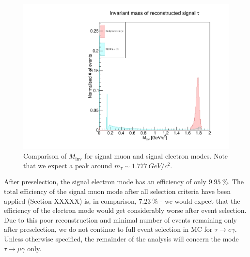 \documentclass[12pt]{thesis}  %
\begin{document}
\begin{figure}
\centering
\includegraphics[width=0.6\linewidth]{images/tauMG-tauEG-tauinvmass.pdf}
\caption[]%
{{\small Comparison of $M_{\text{inv}}$ for signal muon and signal electron modes. Note that we expect a peak around $m_{\tau}\sim \SI{1.777}{GeV/c^2}$.}}
\label{fig:tauMG tauMG tauinvmass}
\end{figure}

After preselection, the signal electron mode has an efficiency of only $\SI{9.95}{\percent}$. The total efficiency of the signal muon mode after all selection criteria have been applied (Section XXXXX) is, in comparison, $\SI{7.23}{\percent}$ - we would expect that the efficiency of the electron mode would get considerably worse after event selection. Due to this poor reconstruction and minimal number of events remaining only after preselection, we do not continue to full event selection in MC for $\tau\to e\gamma$. Unless otherwise specified, the remainder of the analysis will concern the mode $\tau\to\mu\gamma$ only.


\pagebreak

\end{document}
